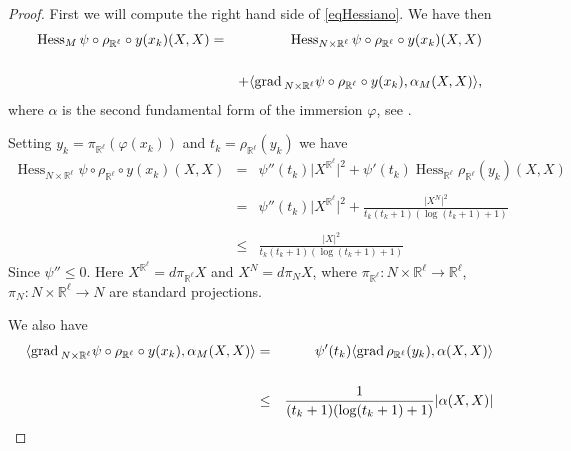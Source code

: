 \documentclass[a4paper]{amsart}
\begin{document}
\begin{proof}
 \noindent First we will compute the right hand side of \eqref{eqHessiano}.  We have then
\begin{eqnarray}\operatorname{Hess}_{M}\psi\circ \rho_{\mathbb{R}^{\ell}}\circ y(x_{k})(X,X)&=&\operatorname{Hess}_{N\times \mathbb{R}^{\ell}}\psi\circ \rho_{\mathbb{R}^{\ell}}\circ y(x_{k})(X,X)\nonumber \\
&&\label{eqHessiano2}\\
&&+ \langle {{{\rm{grad}\,}}}_{N\times \mathbb{R}^{\ell}} \psi\circ \rho_{\mathbb{R}^{\ell}}\circ y(x_{k}), \alpha_{M}(X,X) \rangle ,  \nonumber
\end{eqnarray}
where $\alpha$ is the second fundamental form of the immersion $\varphi$, see \cite{jorge-koutrofiotis}.
\vspace{2mm}

\noindent
Setting  $y_{k}=\pi_{\mathbb{R}^{\ell}}(\varphi (x_{k}))$ and $t_{k}=\rho_{\mathbb{R}^{\ell}}(y_k)$ we have 
\begin{eqnarray}
\operatorname{Hess}_{N\times \mathbb{R}^{\ell}}\psi\circ \rho_{\mathbb{R}^{\ell}}\circ y(x_{k})(X,X) &=&  \psi''(t_k)\vert X^{\mathbb{R}^{\ell}}\vert^{2}+\psi'(t_k)\operatorname{Hess}_{\mathbb{R}^{\ell}} \rho_{\mathbb{R}^{\ell}}(y_k)(X,X)\nonumber\\
&&\nonumber\label{eqHessiano3} \\
&=&   \psi''(t_k)\vert X^{\mathbb{R}^{\ell}}\vert^{2}+ \frac{\vert X^{N}\vert^{2}}{t_k(t_k+1)(\log (t_k+1)+1)}\\
&&\nonumber \\ 
&\leq & \frac{\vert X\vert^{2}}{t_k(t_k+1)(\log (t_k+1)+1)}\nonumber 
\end{eqnarray}Since $\psi'' \leq 0$.
 Here $X^{\mathbb{R}^{\ell}}=d\pi_{\mathbb{R}^{\ell}}X$ and  $X^{N}= d\pi_{N}X$, where $\pi_{\mathbb{R}^{\ell}}\colon N\times \mathbb{R}^{\ell}\to \mathbb{R}^{\ell} $, $\pi_{N}\colon N\times \mathbb{R}^{\ell}\to N $ are standard projections.
 
 We also have 
 \begin{eqnarray}\langle {{{\rm{grad}\,}}}_{N\times \mathbb{R}^{\ell}} \psi\circ \rho_{\mathbb{R}^{\ell}}\circ y(x_{k}), \alpha_{M}(X,X)\rangle &=& \psi'(t_k)\langle {{{\rm{grad}\,}}} \rho_{\mathbb{R}^{\ell}}(y_k), \alpha (X, X)\rangle  \nonumber\\ 
 && \nonumber \\
 &\leq & \frac{1}{(t_k+1)(\log (t_k+1)+1)}\vert \alpha(X,X)\vert \label{eqHessiano4} \end{eqnarray}


\end{proof}
\end{document}

